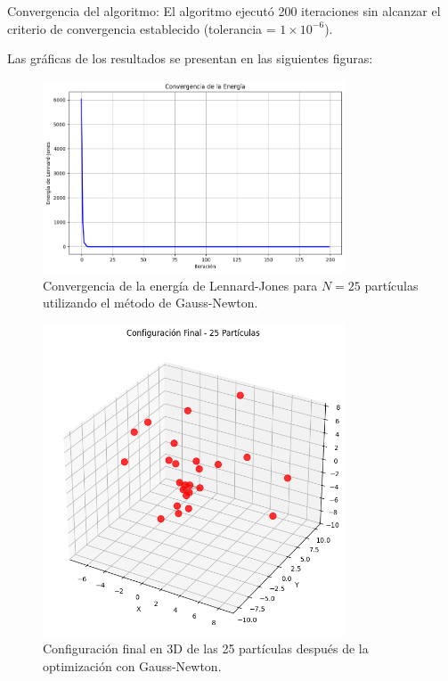 \documentclass{article}
\begin{document}
Convergencia del algoritmo:
El algoritmo ejecutó 200 iteraciones sin alcanzar el criterio de convergencia establecido (tolerancia = $1 \times 10^{-6}$).

Las gráficas de los resultados se presentan en las siguientes figuras:

\begin{figure}[H]
    \centering
    \includegraphics[width=0.8\textwidth]{images/9_descenso.png}
    \caption{Convergencia de la energía de Lennard-Jones para $N=25$ partículas utilizando el método de Gauss-Newton.}
\end{figure}

\begin{figure}[H]
    \centering
    \includegraphics[width=0.8\textwidth]{images/9_configuracion_x.png}
    \caption{Configuración final en 3D de las 25 partículas después de la optimización con Gauss-Newton.}
\end{figure}
\end{document}
